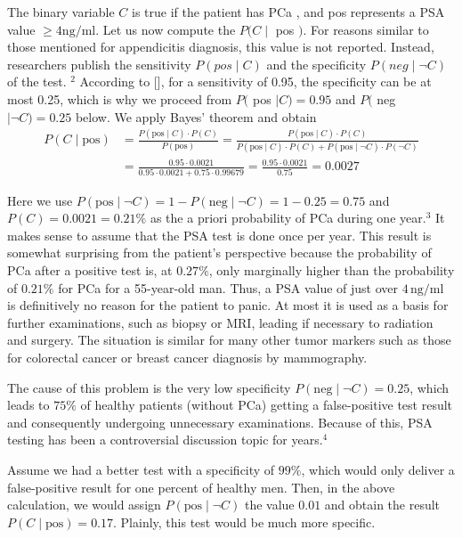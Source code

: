 \documentclass[10pt]{book}
\begin{document}
The binary variable $C$ is true if the patient has PCa , and pos represents a PSA value $\geq 4 \mathrm{ng} / \mathrm{ml}$. Let us now compute the $P(C \mid$ pos $)$. For reasons similar to those mentioned for appendicitis diagnosis, this value is not reported. Instead, researchers publish the sensitivity $P(p o s \mid C)$ and the specificity $P(n e g \mid \neg C)$ of the test. ${ }^{2}$ According to [\cite{hammerer2004psa}], for a sensitivity of 0.95, the specificity can be at most 0.25, which is why we proceed from $P($ pos $\mid C)=0.95$ and $P($ neg $\mid \neg C)=0.25$ below. We apply Bayes' theorem and obtain
$$
\begin{aligned}
P(C\mid \mathrm{pos}) &= \frac{P(\mathrm{pos}\mid C)\cdot P(C)}{P(\mathrm{pos})}
= \frac{P(\mathrm{pos}\mid C)\cdot P(C)}{P(\mathrm{pos}\mid C)\cdot P(C)+P(\mathrm{pos}\mid \neg C)\cdot P(\neg C)} \\
&= \frac{0.95\cdot 0.0021}{0.95\cdot 0.0021+0.75\cdot 0.99679}=\frac{0.95\cdot 0.0021}{0.75}=0.0027
\end{aligned}
$$

Here we use $P(\mathrm{pos}\mid \neg C)=1-P(\mathrm{neg}\mid \neg C)=1-0.25=0.75$ and $P(C)=0.0021=0.21\%$ as the a priori probability of PCa during one year.${ }^{3}$ It makes sense to assume that the PSA test is done once per year. This result is somewhat surprising from the patient's perspective because the probability of PCa after a positive test is, at $0.27\%$, only marginally higher than the probability of $0.21\%$ for PCa for a 55-year-old man. Thus, a PSA value of just over $4\,\mathrm{ng}/\mathrm{ml}$ is definitively no reason for the patient to panic. At most it is used as a basis for further examinations, such as biopsy or MRI, leading if necessary to radiation and surgery. The situation is similar for many other tumor markers such as those for colorectal cancer or breast cancer diagnosis by mammography.

The cause of this problem is the very low specificity $P(\mathrm{neg}\mid \neg C)=0.25$, which leads to $75\%$ of healthy patients (without PCa) getting a false-positive test result and consequently undergoing unnecessary examinations. Because of this, PSA testing has been a controversial discussion topic for years.${ }^{4}$

Assume we had a better test with a specificity of $99\%$, which would only deliver a false-positive result for one percent of healthy men. Then, in the above calculation, we would assign $P(\mathrm{pos}\mid \neg C)$ the value $0.01$ and obtain the result $P(C\mid \mathrm{pos})=0.17$. Plainly, this test would be much more specific.
\end{document}
